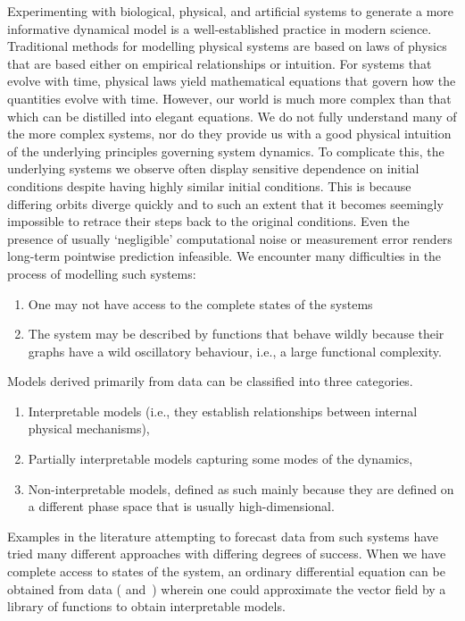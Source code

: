 
Experimenting with biological, physical, and artificial systems to generate a more informative dynamical model is a well-established practice in modern science. 
Traditional methods for modelling physical systems are based on laws of physics that are based either on empirical relationships or intuition. 
For systems that evolve with time, physical laws yield mathematical equations that govern how the quantities evolve with time. 
However, our world is much more complex than that which can be distilled into elegant equations. 
We do not fully understand many of the more complex systems, nor do they provide us with a good physical intuition of the underlying principles governing system dynamics. To complicate this, the underlying systems we observe often display sensitive dependence on initial conditions despite having highly similar initial conditions. This is because differing orbits diverge quickly and to such an extent that it becomes seemingly impossible to retrace their steps back to the original conditions. Even the presence of usually `negligible' computational noise or measurement error renders long-term pointwise prediction infeasible. 
We encounter many difficulties in the process of modelling such systems:

\vspace{-8mm}
\begin{enumerate}[noitemsep, label=\roman*.]
  \item One may not have access to the complete states of the systems
  \item The system may be described by functions that behave wildly because their graphs have a wild oscillatory behaviour, i.e., a large functional complexity.
\end{enumerate}


Models derived primarily from data can be classified into three categories.
\vspace{-8mm}
\begin{enumerate}[noitemsep, label=\roman*.]
  \item  Interpretable models (i.e., they establish relationships between internal physical mechanisms), 
  \item Partially interpretable models capturing some modes of the dynamics, 
  \item Non-interpretable models, defined as such mainly because they are defined on a different phase space that is usually high-dimensional. 
\end{enumerate}

Examples in the literature attempting to forecast data from such systems have tried many different approaches with differing degrees of success. 
When we have complete access to states of the system, an ordinary differential equation can be obtained from data (\cite{brunton2016discovering, champion2019data} and~\cite{small2002modeling,xu2006modeling}) wherein one could approximate the vector field by a library of functions to obtain interpretable models. 


